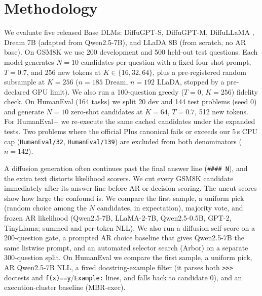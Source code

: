 \section{Methodology}
\label{sec:methodology}

We evaluate five released Base DLMs: DiffuGPT-S, DiffuGPT-M, DiffuLLaMA \cite{gong2025diffullama}, Dream 7B \cite{ye2025dream7b} (adapted from Qwen2.5-7B), and LLaDA 8B \cite{nie2025llada} (from scratch, no AR base). On GSM8K \cite{cobbe2021gsm8k} we use 200 development and 500 held-out test questions. Each model generates $N=10$ candidates per question with a fixed four-shot prompt, $T=0.7$, and 256 new tokens at $K\in\{16,32,64\}$, plus a pre-registered random subsample at $K=256$ ($n=185$ Dream, $n=192$ LLaDA, stopped by a pre-declared GPU limit). We also run a 100-question greedy ($T=0$, $K=256$) fidelity check. On HumanEval \cite{chen2021humaneval} (164 tasks) we split 20 dev and 144 test problems (seed 0) and generate $N=10$ zero-shot candidates at $K=64$, $T=0.7$, 512 new tokens. For HumanEval+ \cite{liu2023evalplus} we re-execute the same cached candidates under the expanded tests. Two problems where the official Plus canonical fails or exceeds our 5\,s CPU cap (\texttt{HumanEval/32}, \texttt{HumanEval/139}) are excluded from both denominators ($n=142$).

A diffusion generation often continues past the final answer line (\texttt{\#\#\#\#~N}), and the extra text distorts likelihood scorers. We cut every GSM8K candidate immediately after its answer line before AR or decision scoring. The uncut scores show how large the confound is. We compare the first sample, a uniform pick (random choice among the $N$ candidates, in expectation), majority vote, and frozen AR likelihood (Qwen2.5-7B, LLaMA-2-7B, Qwen2.5-0.5B, GPT-2, TinyLlama; summed and per-token NLL). We also run a diffusion self-score on a 200-question gate, a prompted AR choice baseline that gives Qwen2.5-7B the same listwise prompt, and an automated selector search (Arbor) on a separate 300-question split. On HumanEval we compare the first sample, a uniform pick, AR Qwen2.5-7B NLL, a fixed docstring-example filter (it parses both \texttt{>{}>{}>} doctests and \texttt{f(x)==y}/\texttt{Example:} lines, and falls back to candidate 0), and an execution-cluster baseline (MBR-exec).

